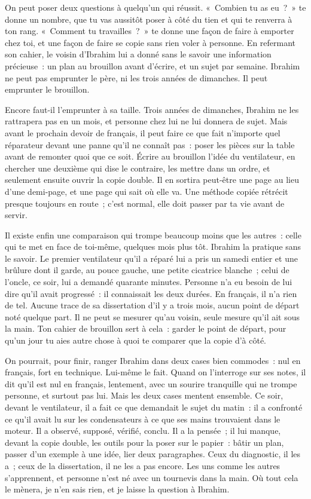 \documentclass[10.5pt,twoside,openright]{book}
\begin{document}
On peut poser deux questions à quelqu’un qui réussit. « Combien tu as eu ? » te donne un nombre, que tu vas aussitôt poser à côté du tien et qui te renverra à ton rang. « Comment tu travailles ? » te donne une façon de faire à emporter chez toi, et une façon de faire se copie sans rien voler à personne. En refermant son cahier, le voisin d’Ibrahim lui a donné sans le savoir une information précieuse : un plan au brouillon avant d’écrire, et un sujet par semaine. Ibrahim ne peut pas emprunter le père, ni les trois années de dimanches. Il peut emprunter le brouillon.

Encore faut-il l’emprunter à sa taille. Trois années de dimanches, Ibrahim ne les rattrapera pas en un mois, et personne chez lui ne lui donnera de sujet. Mais avant le prochain devoir de français, il peut faire ce que fait n’importe quel réparateur devant une panne qu’il ne connaît pas : poser les pièces sur la table avant de remonter quoi que ce soit. Écrire au brouillon l’idée du ventilateur, en chercher une deuxième qui dise le contraire, les mettre dans un ordre, et seulement ensuite ouvrir la copie double. Il en sortira peut-être une page au lieu d’une demi-page, et une page qui sait où elle va. Une méthode copiée rétrécit presque toujours en route ; c’est normal, elle doit passer par ta vie avant de servir.

Il existe enfin une comparaison qui trompe beaucoup moins que les autres : celle qui te met en face de toi-même, quelques mois plus tôt. Ibrahim la pratique sans le savoir. Le premier ventilateur qu’il a réparé lui a pris un samedi entier et une brûlure dont il garde, au pouce gauche, une petite cicatrice blanche ; celui de l’oncle, ce soir, lui a demandé quarante minutes. Personne n’a eu besoin de lui dire qu’il avait progressé : il connaissait les deux durées. En français, il n’a rien de tel. Aucune trace de sa dissertation d’il y a trois mois, aucun point de départ noté quelque part. Il ne peut se mesurer qu’au voisin, seule mesure qu’il ait sous la main. Ton cahier de brouillon sert à cela : garder le point de départ, pour qu’un jour tu aies autre chose à quoi te comparer que la copie d’à côté.

On pourrait, pour finir, ranger Ibrahim dans deux cases bien commodes : nul en français, fort en technique. Lui-même le fait. Quand on l’interroge sur ses notes, il dit qu’il est nul en français, lentement, avec un sourire tranquille qui ne trompe personne, et surtout pas lui. Mais les deux cases mentent ensemble. Ce soir, devant le ventilateur, il a fait ce que demandait le sujet du matin : il a confronté ce qu’il avait lu sur les condensateurs à ce que ses mains trouvaient dans le moteur. Il a observé, supposé, vérifié, conclu. Il a la pensée ; il lui manque, devant la copie double, les outils pour la poser sur le papier : bâtir un plan, passer d’un exemple à une idée, lier deux paragraphes. Ceux du diagnostic, il les a ; ceux de la dissertation, il ne les a pas encore. Les uns comme les autres s’apprennent, et personne n’est né avec un tournevis dans la main. Où tout cela le mènera, je n’en sais rien, et je laisse la question à Ibrahim.
\end{document}
